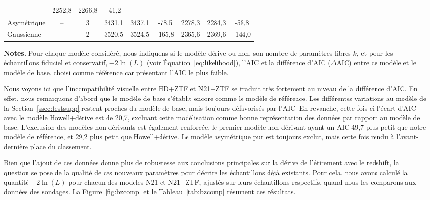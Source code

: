 \documentclass[../main/main.tex]{subfiles}
\begin{document}
\begin{landscape}
\begin{table}[p]
\begin{threeparttable}
{\begin{tabular}{lcccccccc}
            & 2252,8 & 2266,8 & -41,2 \\
            Asymétrique & -- & 3
            & 3431,1 & 3437,1 & -78,5
            & 2278,3 & 2284,3 & -58,8 \\
            Gaussienne & -- & 2
            & 3520,5 & 3524,5 & -165,8
            & 2365,6 & 2369,6 & -144,0 \\
            \bottomrule
        \end{tabular}}
        \begin{tablenotes}[flushleft]
            \item\small \textbf{\hspace{-3.2pt}Notes.} Pour chaque modèle considéré,
                nous indiquons si le modèle dérive ou non, son nombre de
                paramètres libres $k$, et pour les échantillons fiduciel et
                conservatif, $-2\ln(L)$ (voir Équation~\ref{eq:likelihood}),
                l'AIC et la différence d'AIC ($\Delta$AIC) entre ce modèle et le
                modèle de base, choisi comme référence car présentant l'AIC le
                plus faible.
        \end{tablenotes}
    \end{threeparttable}
\end{table}
\end{landscape}
\restoregeometry

Nous voyons ici que l'incompatibilité visuelle entre HD+ZTF et N21+ZTF se
traduit très fortement au niveau de la différence d'AIC. En effet, nous
remarquons d'abord que le modèle de base s'établit encore comme le modèle de
référence. Les différentes variations au modèle de la
Section~\ref{ssec:testsupp} restent proches du modèle de base, mais toujours
défavorisés par l'AIC. En revanche, cette fois ci l'écart d'AIC avec le modèle
Howell+dérive est de 20,7, excluant cette modélisation comme bonne
représentation des données par rapport au modèle de base. L'exclusion des
modèles non-dérivants est également renforcée, le premier modèle non-dérivant
ayant un AIC 49,7 plus petit que notre modèle de référence, et 29,2 plus petit
que Howell+dérive. Le modèle asymétrique pur est toujours exclut, mais cette
fois rendu à l'avant-dernière place du classement.

Bien que l'ajout de ces données donne plus de robustesse aux conclusions
principales sur la dérive de l'étirement avec le redshift, la question se pose
de la qualité de ces nouveaux paramètres pour décrire les échantillons déjà
existants. Pour cela, nous avons calculé la quantité $-2\ln(L)$ pour chacun des
modèles N21 et N21+ZTF, ajustés sur leurs échantillons respectifs, quand nous les
comparons aux données des sondages. La Figure~\ref{fig:bzcomp} et le
Tableau~\ref{tab:bzcomp} résument ces résultats.
\end{document}
